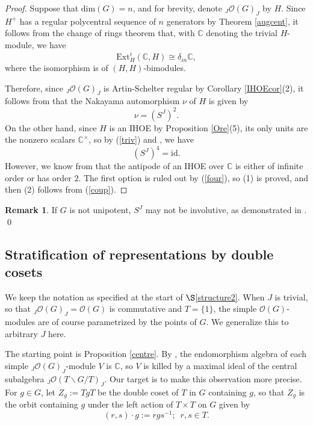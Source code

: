 \documentclass{amsart}
\numberwithin{equation}{section}
\theoremstyle{definition}
\newtheorem{remark}[theorem]{Remark}
\begin{document}
\begin{proof} 
Suppose that $\mathrm{dim}(G) =n$, and for brevity, denote ${}_J\mathcal{O}(G)_J$ by $H$. Since $H^+$ has a regular polycentral sequence of $n$ generators by Theorem \ref{augcent}, it follows from the change of rings theorem 
\cite[Lemma, $\S$6.5]{BZ} that, with $\mathbb{C}$ denoting the trivial $H$-module, we have
\begin{equation}\label{triv} \mathrm{Ext}^i_H(\mathbb{C},H)\cong  \delta_{in}\mathbb{C}, 
\end{equation}
where the isomorphism is of $(H,H)$-bimodules. 

Therefore, since ${}_J\mathcal{O}(G)_J$ is Artin-Schelter regular by Corollary \ref{IHOEcor}(2), it follows from \cite[Proposition 4.5]{BZ} that the Nakayama automorphism $\nu$ of $H$ is given by
\begin{equation}\label{coup} \nu = (S^J)^2.
\end{equation}
On the other hand, since $H$ is an IHOE by Proposition \ref{Ore}(5), its only units are the nonzero scalars $\mathbb{C}^{\times}$, so by (\ref{triv}) and \cite[Corollary 4.6]{BZ}, we have
\begin{equation}\label{four} (S^{J})^4 = \mathrm{id}. 
\end{equation} 
However, we know from \cite[Theorem 3.2(viii)]{BOZZ} that the antipode of an IHOE over $\mathbb{C}$ is either of infinite order or has order $2$. The first option is ruled out by (\ref{four}), so (1) is proved, and then (2) follows from (\ref{coup}).   
\end{proof}

\begin{remark}\label{ssqnot1}
If $G$ is not unipotent, $S^J$ may not be involutive, as demonstrated in \cite[Example 5.2]{EG1}. \qed
\end{remark}

\subsection{Stratification of representations by double cosets}\label{repstrat}

We keep the notation as specified at the start of $\S$\ref{structure2}. When $J$ is trivial, so that ${}_J\mathcal{O}(G)_J = \mathcal{O}(G)$ is commutative and $T = \{1\}$, the simple $\mathcal{O}(G)$-modules are of course parametrized by the points of $G$. We generalize this to arbitrary $J$ here.

The starting point is Proposition \ref{centre}. By \cite[Proposition 9.1.7]{McCR}, the endomorphism algebra of each simple ${}_J\mathcal{O}(G)_J$-module $V$ is $\mathbb{C}$, so $V$ is killed by a maximal ideal of the central subalgebra ${}_J\mathcal{O}(T\backslash G / T)_J$. Our target is to make this observation more precise. For $g \in G$, let $Z_g := TgT$ be the double coset of $T$ in $G$ containing $g$, so that $Z_g$ is the orbit containing $g$ under the left action of $T \times T$ on $G$ given by
\begin{equation}\label{act} 
(r,s)\cdot g := rgs^{-1};\,\,\,r,s \in T. 
\end{equation}
\end{document}
